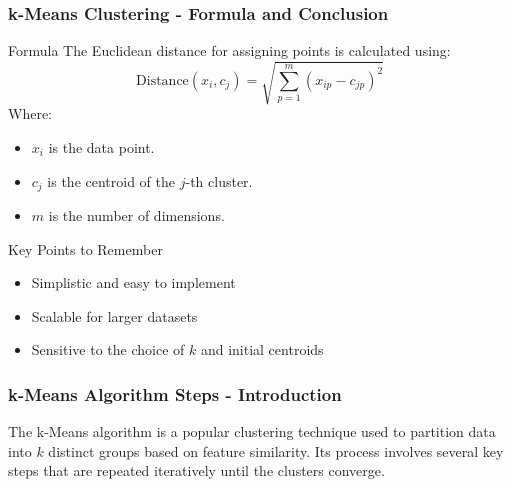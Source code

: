 \documentclass[aspectratio=169]{beamer}
\begin{document}
\begin{frame}[fragile]
    \frametitle{k-Means Clustering - Formula and Conclusion}
    
    \begin{block}{Formula}
        The Euclidean distance for assigning points is calculated using:
        \begin{equation}
            \text{Distance}(x_i, c_j) = \sqrt{\sum_{p=1}^{m}(x_{ip} - c_{jp})^2}
        \end{equation}
        Where:
        \begin{itemize}
            \item \( x_i \) is the data point.
            \item \( c_j \) is the centroid of the \( j \)-th cluster.
            \item \( m \) is the number of dimensions.
        \end{itemize}
    \end{block}
    
    \begin{block}{Key Points to Remember}
        \begin{itemize}
            \item Simplistic and easy to implement
            \item Scalable for larger datasets
            \item Sensitive to the choice of \( k \) and initial centroids
        \end{itemize}
    \end{block}
\end{frame}

\begin{frame}[fragile]
    \frametitle{k-Means Algorithm Steps - Introduction}
    The k-Means algorithm is a popular clustering technique used to partition data into \( k \) distinct groups based on feature similarity. Its process involves several key steps that are repeated iteratively until the clusters converge.
\end{frame}
\end{document}
